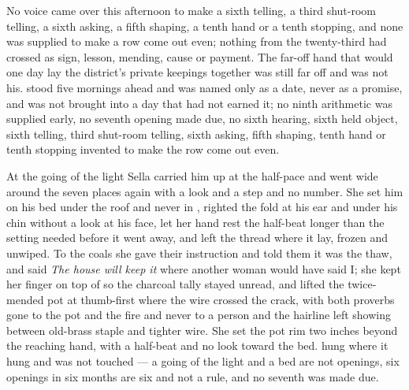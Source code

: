 No voice came over  this afternoon to make a sixth telling, a third shut-room telling, a sixth asking, a fifth shaping, a tenth hand or a tenth stopping, and none was supplied to make a row come out even; nothing from the twenty-third had crossed as sign, lesson, mending, cause or payment. The far-off hand that would one day lay the district's private keepings together was still far off and was not his.  stood five mornings ahead and was named only as a date, never as a promise, and was not brought into a day that had not earned it; no ninth arithmetic was supplied early, no seventh opening made due, no sixth hearing, sixth held object, sixth telling, third shut-room telling, sixth asking, fifth shaping, tenth hand or tenth stopping invented to make the row come out even.

At the going of the light Sella carried him up at the half-pace and went wide around the seven places again with a look and a step and no number. She set him on his bed under the roof and never in , righted the fold at his ear and under his chin without a look at his face, let her hand rest the half-beat longer than the setting needed before it went away, and left the thread where it lay, frozen and unwiped. To the coals she gave their instruction and told them it was the thaw, and said \emph{The house will keep it} where another woman would have said I; she kept her finger on top of  so the charcoal tally stayed unread, and lifted the twice-mended pot at  thumb-first where the wire crossed the crack, with both proverbs gone to the pot and the fire and never to a person and the hairline left showing between old-brass staple and tighter wire. She set the pot rim two inches beyond the reaching hand, with a half-beat and no look toward the bed.  hung where it hung and was not touched --- a going of the light and a bed are not openings, six openings in six months are six and not a rule, and no seventh was made due.

